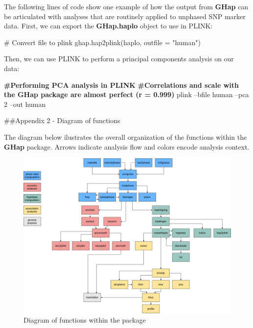 \documentclass[
]{article}
\newenvironment{Shaded}{}{}
\newcommand{\CommentTok}[1]{\textcolor[rgb]{0.00,0.50,0.00}{#1}}
\newcommand{\DataTypeTok}[1]{#1}
\newcommand{\DecValTok}[1]{#1}
\newcommand{\ErrorTok}[1]{\textcolor[rgb]{1.00,0.00,0.00}{\textbf{#1}}}
\newcommand{\KeywordTok}[1]{\textcolor[rgb]{0.00,0.00,1.00}{#1}}
\newcommand{\NormalTok}[1]{#1}
\newcommand{\StringTok}[1]{\textcolor[rgb]{0.00,0.50,0.50}{#1}}
\begin{document}
The following lines of code show one example of how the output from
\textbf{GHap} can be articulated with analyses that are routinely
applied to unphased SNP marker data. First, we can export the
\textbf{GHap.haplo} object to use in PLINK:

\begin{Shaded}
\begin{Highlighting}[]
\CommentTok{# Convert file to plink}
\KeywordTok{ghap.hap2plink}\NormalTok{(haplo, }\DataTypeTok{outfile =} \StringTok{"human"}\NormalTok{)}
\end{Highlighting}
\end{Shaded}

Then, we can use PLINK to perform a principal components analysis on our
data:

\begin{Shaded}
\begin{Highlighting}[]
\ErrorTok{#Performing PCA analysis in PLINK}
\ErrorTok{#Correlations and scale with the GHap package are almost perfect (r = 0.999)}
\NormalTok{plink --bfile human --pca }\DecValTok{2}\NormalTok{ --out human}
\end{Highlighting}
\end{Shaded}

\pagebreak

\#\#Appendix 2 - Diagram of functions

The diagram below ilustrates the overall organization of the functions
within the \textbf{GHap} package. Arrows indicate analysis flow and
colors encode analysis context.

\begin{figure}[H]
\includegraphics[width=1\linewidth]{diagram_20200718} \caption{Diagram of functions within the package}\label{fig:pressure}
\end{figure}
\end{document}
